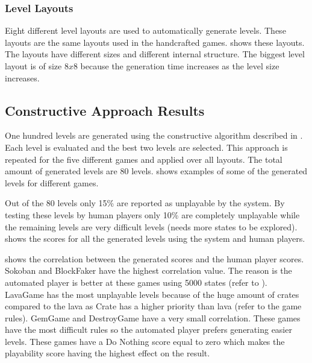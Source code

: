 \subsubsection{Level Layouts}
Eight different level layouts are used to automatically generate levels. These layouts are the same layouts used in the handcrafted games.  shows these layouts. The layouts have different sizes and different internal structure. The biggest level layout is of size $8x8$ because the generation time increases as the level size increases.


\subsection{Constructive Approach Results}
One hundred levels are generated using the constructive algorithm described in . Each level is evaluated and the best two levels are selected. This approach is repeated for the five different games and applied over all layouts. The total amount of generated levels are 80 levels.  shows examples of some of the generated levels for different games.\\\par


Out of the 80 levels only 15\% are reported as unplayable by the system. By testing these levels by human players only 10\% are completely unplayable while the remaining levels are very difficult levels (needs more states to be explored).  shows the scores for all the generated levels using the system and human players.\\\par

 shows the correlation between the generated scores and the human player scores. Sokoban and BlockFaker have the highest correlation value. The reason is the automated player is better at these games using 5000 states (refer to ). LavaGame has the most unplayable levels because of the huge amount of crates compared to the lava as Crate has a higher priority than lava (refer to the game rules). GemGame and DestroyGame have a very small correlation. These games have the most difficult rules so the automated player prefers generating easier levels. These games have a Do Nothing score equal to zero which makes the playability score having the highest effect on the result.

